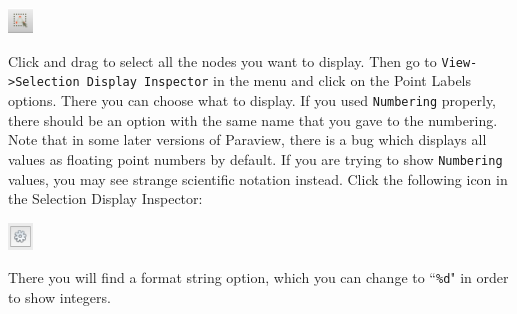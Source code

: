 \documentclass{article}
\begin{document}
\begin{center}
\includegraphics[width=0.05\textwidth]{select_nodes.png}
\end{center}

Click and drag to select all the nodes you want to display.
Then go to \texttt{View->Selection Display Inspector} in the menu and click on
the Point Labels options.
There you can choose what to display.
If you used \texttt{Numbering} properly, there should be an option
with the same name that you gave to the numbering.
Note that in some later versions of Paraview, there is a bug which
displays all values as floating point numbers by default.
If you are trying to show \texttt{Numbering} values, you may
see strange scientific notation instead.
Click the following icon in the Selection Display Inspector:

\begin{center}
\includegraphics[width=0.05\textwidth]{gear.png}
\end{center}

There you will find a format string option, which you can change
to ``\texttt{\%d}" in order to show integers.
\end{document}
